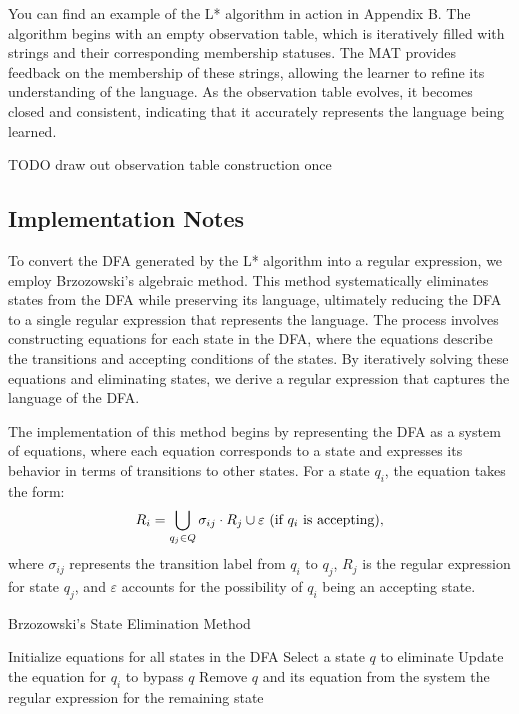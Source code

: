 You can find an example of the L* algorithm in action in Appendix B. The algorithm begins with an empty observation table, which is iteratively filled with strings and their corresponding membership statuses. The MAT provides feedback on the membership of these strings, allowing the learner to refine its understanding of the language. As the observation table evolves, it becomes closed and consistent, indicating that it accurately represents the language being learned.

TODO draw out observation table construction once

\subsection{Implementation Notes}

\indent\indent To convert the DFA generated by the L* algorithm into a regular expression, we employ Brzozowski's algebraic method. This method systematically eliminates states from the DFA while preserving its language, ultimately reducing the DFA to a single regular expression that represents the language. The process involves constructing equations for each state in the DFA, where the equations describe the transitions and accepting conditions of the states. By iteratively solving these equations and eliminating states, we derive a regular expression that captures the language of the DFA.

\indent\indent The implementation of this method begins by representing the DFA as a system of equations, where each equation corresponds to a state and expresses its behavior in terms of transitions to other states. For a state \( q_i \), the equation takes the form:
\[
R_i = \bigcup_{q_j \in Q} \sigma_{ij} \cdot R_j \cup \varepsilon \text{ (if \( q_i \) is accepting)},
\]
where \( \sigma_{ij} \) represents the transition label from \( q_i \) to \( q_j \), \( R_j \) is the regular expression for state \( q_j \), and \( \varepsilon \) accounts for the possibility of \( q_i \) being an accepting state.

\begin{algorithm}
    \caption{Brzozowski's State Elimination Method}
    \label{alg:brzozowski}
    \begin{algorithmic}[1]
    \State Initialize equations for all states in the DFA
        \State Select a state \( q \) to eliminate
            \State Update the equation for \( q_i \) to bypass \( q \)
        \EndFor
        \State Remove \( q \) and its equation from the system
    \EndWhile
    \State \Return the regular expression for the remaining state
    \end{algorithmic}
\end{algorithm}

